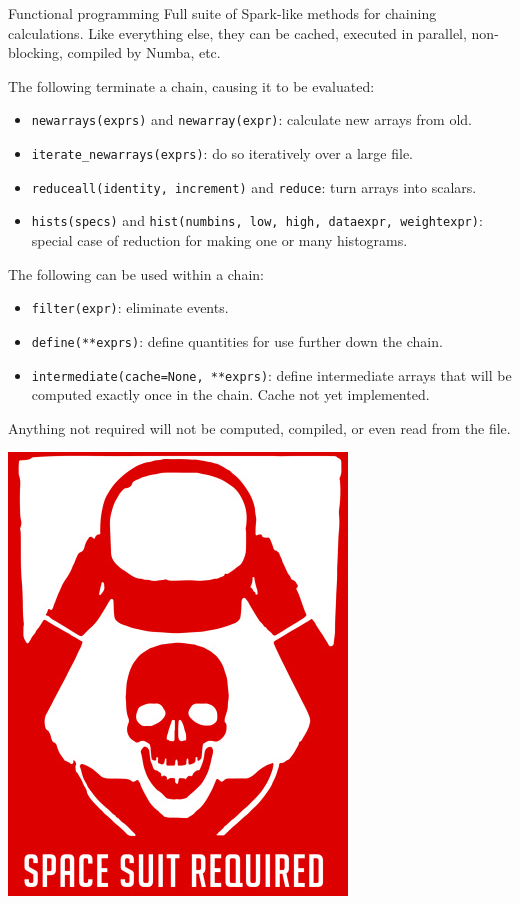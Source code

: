 \documentclass[aspectratio=169]{beamer}
\begin{document}
\begin{frame}{Functional programming}
\vspace{0.35 cm}
Full suite of Spark-like methods for chaining calculations. Like everything else, they can be cached, executed in parallel, non-blocking, compiled by Numba, etc.

\vspace{0.25 cm}
The following terminate a chain, causing it to be evaluated:
\begin{itemize}
\item {\tt\small newarrays(exprs)} and {\tt\small newarray(expr)}: calculate new arrays from old.
\item {\tt\small iterate\_newarrays(exprs)}: do so iteratively over a large file.
\item {\tt\small reduceall(identity, increment)} and {\tt\small reduce}: turn arrays into scalars.
\item {\tt\small hists(specs)} and {\tt\small hist(numbins, low, high, dataexpr, weightexpr)}: special case of reduction for making one or many histograms.
\end{itemize}

\vspace{0.25 cm}
The following can be used within a chain:
\begin{itemize}
\item {\tt\small filter(expr)}: eliminate events.
\item {\tt\small define(**exprs)}: define quantities for use further down the chain.
\item {\tt\small intermediate(cache=None, **exprs)}: define intermediate arrays that will be computed exactly once in the chain. Cache not yet implemented.
\end{itemize}

\vspace{0.25 cm}
Anything not required will not be computed, compiled, or even read from the file.

\vspace{-6.9 cm}
\hfill \includegraphics[width=1.5 cm]{danger.png}\hspace{-0.9 cm}
\vspace{6.9 cm}
\end{frame}
\end{document}
